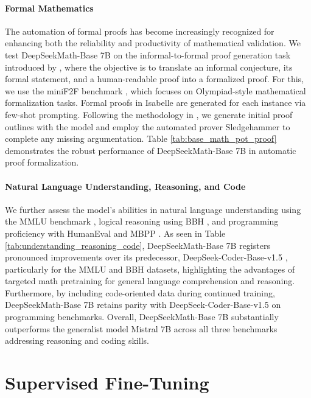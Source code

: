 \paragraph{Formal Mathematics}

The automation of formal proofs has become increasingly recognized for enhancing both the reliability and productivity of mathematical validation. We test DeepSeekMath-Base 7B on the informal-to-formal proof generation task introduced by \citep{dsp_proof}, where the objective is to translate an informal conjecture, its formal statement, and a human-readable proof into a formalized proof. For this, we use the miniF2F benchmark \citep{minif2f}, which focuses on Olympiad-style mathematical formalization tasks. Formal proofs in Isabelle are generated for each instance via few-shot prompting. Following the methodology in \cite{dsp_proof}, we generate initial proof outlines with the model and employ the automated prover Sledgehammer \citep{sledgehammer} to complete any missing argumentation. Table \ref{tab:base_math_pot_proof} demonstrates the robust performance of DeepSeekMath-Base 7B in automatic proof formalization.

\paragraph{Natural Language Understanding, Reasoning, and Code}

We further assess the model's abilities in natural language understanding using the MMLU benchmark \citep{mmlu}, logical reasoning using BBH \citep{bbh}, and programming proficiency with HumanEval \citep{codex} and MBPP \citep{mbpp}. As seen in Table \ref{tab:understanding_reasoning_code}, DeepSeekMath-Base 7B registers pronounced improvements over its predecessor, DeepSeek-Coder-Base-v1.5 \citep{deepseek-coder}, particularly for the MMLU and BBH datasets, highlighting the advantages of targeted math pretraining for general language comprehension and reasoning. Furthermore, by including code-oriented data during continued training, DeepSeekMath-Base 7B retains parity with DeepSeek-Coder-Base-v1.5 on programming benchmarks. Overall, DeepSeekMath-Base 7B substantially outperforms the generalist model Mistral 7B \citep{mistral} across all three benchmarks addressing reasoning and coding skills.

\section{Supervised Fine-Tuning}

